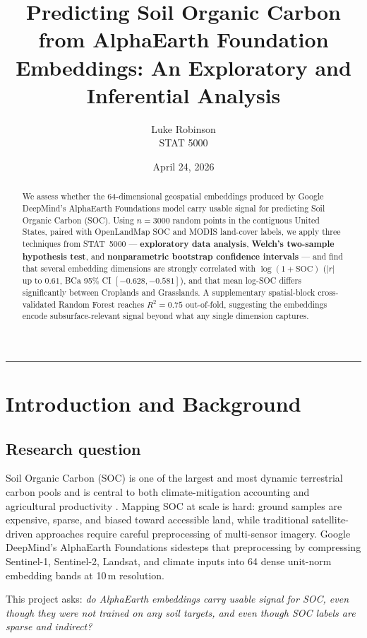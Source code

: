 \documentclass[11pt]{article}
\title{\textbf{Predicting Soil Organic Carbon from AlphaEarth Foundation
Embeddings: An Exploratory and Inferential Analysis}}
\author{Luke Robinson \\ STAT 5000}
\date{April 24, 2026}
\begin{document}
\maketitle
\hrule
\vspace{0.5em}

\begin{abstract}
\noindent We assess whether the 64-dimensional geospatial embeddings produced
by Google DeepMind's AlphaEarth Foundations model carry usable signal for
predicting Soil Organic Carbon (SOC). Using $n = 3000$ random points in the
contiguous United States, paired with OpenLandMap SOC and MODIS land-cover
labels, we apply three techniques from STAT~5000 ---
\textbf{exploratory data analysis}, \textbf{Welch's two-sample
hypothesis test}, and \textbf{nonparametric bootstrap confidence
intervals} --- and find that several embedding dimensions are strongly
correlated with $\log(1+\mathrm{SOC})$ ($|r|$ up to $0.61$, BCa 95\%
CI $[-0.628, -0.581]$), and that mean log-SOC differs significantly
between Croplands and Grasslands. A supplementary spatial-block
cross-validated Random Forest reaches $R^2 = 0.75$ out-of-fold,
suggesting the embeddings encode subsurface-relevant signal beyond
what any single dimension captures.
\end{abstract}

\section{Introduction and Background}
\subsection{Research question}
Soil Organic Carbon (SOC) is one of the largest and most dynamic terrestrial
carbon pools and is central to both climate-mitigation accounting and
agricultural productivity \cite{lal2004soc}. Mapping SOC at scale is hard:
ground samples are expensive, sparse, and biased toward accessible land,
while traditional satellite-driven approaches require careful preprocessing of
multi-sensor imagery. Google DeepMind's AlphaEarth Foundations
\cite{brown2025alphaearth} sidesteps that preprocessing by compressing
Sentinel-1, Sentinel-2, Landsat, and climate inputs into 64 dense
unit-norm embedding bands at 10\,m resolution.

This project asks: \emph{do AlphaEarth embeddings carry usable signal for
SOC, even though they were not trained on any soil targets, and even though
SOC labels are sparse and indirect?}
\end{document}
